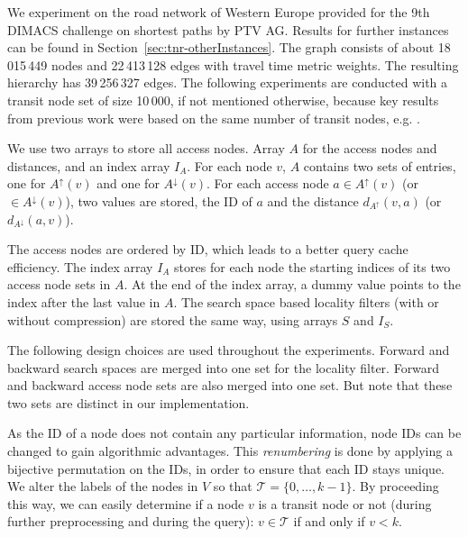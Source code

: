 \documentclass{llncs}
\begin{document}
We experiment on the road network of Western Europe provided for the 9th DIMACS challenge on shortest paths \cite{dgj-spndi-09} by PTV AG.
Results for further instances can be found in Section~\ref{sec:tnr-otherInstances}.
The graph consists of about 18\,015\,449 nodes and 22\,413\,128 edges with travel time metric weights. The resulting hierarchy has 39\,256\,327 edges.
The following experiments are conducted with a transit node set of size 10\,000, if not mentioned otherwise, because key results from previous work were based on the same number of transit nodes, e.g. \cite{bfmss-itcsp-07}.

We use two arrays to store all access nodes.
Array $A$ for the access nodes and distances, and an index array $I_A$. 
For each node $v$, $A$ contains two sets of entries, one for $A^\uparrow(v)$ and one for $A^\downarrow(v)$. For each access node $a \in A^\uparrow(v)$ (or $\in A^\downarrow(v)$), two values are stored, the ID of $a$ and the distance $d_{A^\uparrow}(v, a)$ (or $d_{A^\downarrow}(a, v)$).

The access nodes are ordered by ID, which leads to a better query cache efficiency.
The index array $I_A$ stores for each node the starting indices of its two access node sets in $A$.
At the end of the index array, a dummy value points to the index after the last value in $A$.
The search space based locality filters (with or without compression) are stored the same way, using arrays $S$ and $I_S$.

The following design choices are used throughout the experiments.
Forward and backward search spaces are merged into one set for the locality filter. 
Forward and backward access node sets are also merged into one set.
But note that these two sets are distinct in our implementation.

As the ID of a node does not contain any particular information, node IDs can be changed to gain algorithmic advantages. 
This \textit{renumbering} is done by applying a bijective permutation on the IDs, in order to ensure that each ID stays unique.
We alter the labels of the nodes in $V$ so that $\mathcal{T} = \{0, \dotsc, k-1\}$.
By proceeding this way, we can easily determine if a node $v$ is a transit node or not (during further preprocessing and during the query): $v \in \mathcal{T}$ if and only if $v < k$.
\end{document}
